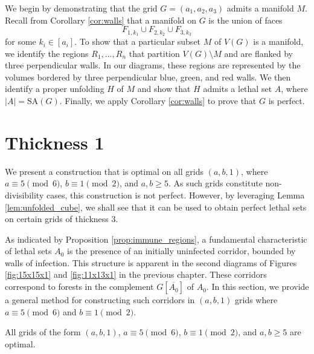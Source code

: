 We begin by demonstrating that the grid $G=(a_1,a_2,a_3)$ admits a manifold $M$. Recall from Corollary \ref{cor:walls} that a manifold on $G$ is the union of faces
$$F_{1,k_1} \cup F_{2,k_2} \cup F_{3,k_3}$$
for some $k_i \in [a_i]$. To show that a particular subset $M$ of $V(G)$ is a manifold, we identify the regions $R_1, \dots, R_n$ that partition $V(G) \setminus M$ and are flanked by three perpendicular walls. In our diagrams, these regions are represented by the volumes bordered by three perpendicular blue, green, and red walls. We then identify a proper unfolding $H$ of $M$ and show that $H$ admits a lethal set $A$, where $|A| = \text{SA}(G)$. Finally, we apply Corollary \ref{cor:walls} to prove that $G$ is perfect. 


\section{Thickness 1}

We present a construction that is optimal on all grids $(a,b,1)$, where $a \equiv 5 \pmod 6$, $b \equiv 1 \pmod 2$, and $a,b \geq 5$. As such grids constitute non-divisibility cases, this construction is not perfect. However, by leveraging Lemma \ref{lem:unfolded_cube}, we shall see that it can be used to obtain perfect lethal sets on certain grids of thickness 3. 

As indicated by Proposition \ref{prop:immune_regions}, a fundamental characteristic of lethal sets $A_0$ is the presence of an initially uninfected corridor, bounded by walls of infection. This structure is apparent in the second diagrams of Figures \ref{fig:15x15x1} and \ref{fig:11x13x1} in the previous chapter. These corridors correspond to forests in the complement $G[\overline{A_0}]$ of $A_0$. In this section, we provide a general method for constructing such corridors in $(a, b, 1)$ grids where $a \equiv 5 \pmod 6$ and $b \equiv 1 \pmod 2$.

\begin{con}
\label{con:snake}
All grids of the form $(a,b,1)$, $a \equiv 5 \pmod 6$, $b \equiv 1 \pmod 2$, and $a,b \geq 5$ are optimal.
\end{con}

